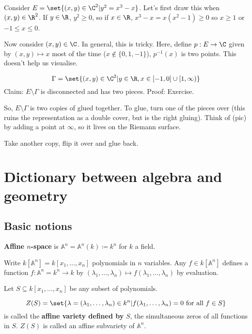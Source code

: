 \documentclass{article}
\newcommand{\A}{\mathbb{A}}
\begin{document}
\maketitle

Consider $E = \set{(x, y) \in \C^2 | y^2 = x^3 - x}$. Let's first draw this when $(x, y) \in \R^2$.
If $y \in \R$, $y^2 \geq 0$, so if $x \in \R$, $x^3 - x = x(x^2 - 1) \geq 0$ so $x \geq 1$ or $-1 \leq x \leq 0$.


Now consider $(x, y) \in \C$. In general, this is tricky.
Here, define $p: E \to \C$ given by $(x, y) \mapsto x$ most of the time ($x \notin \{0, 1, -1\}$), $p^{-1}(x)$ is two points.
This doesn't help us visualise.

\begin{equation*}
    \Gamma = \set{(x, y) \in \C^2 | y \in \R, x \in [-1, 0] \cup [1, \infty)}
\end{equation*}
Claim: $E \setminus \Gamma$ is disconnected and has two pieces.
Proof: Exercise.

So, $E \setminus \Gamma$ is two copies of
glued together. To glue, turn one of the pieces over (this ruins the representation as a double cover, but is the right gluing).
Think of (pic) by adding a point at $\infty$, so it lives on the Riemann surface.

Take another copy, flip it over and glue back.

\section{Dictionary between algebra and geometry}
\subsection{Basic notions}
\begin{defi}
    \textbf{Affine $n$-space} is $\A^n = \A^n(k) \coloneqq k^n$ for $k$ a field.
\end{defi}
Write $k[\A^n] = k[x_1, \dotsc, x_n]$ polynomials in $n$ variables.
Any $f \in k[\A^n]$ defines a function $f: \A^n =k^n \to k$ by $(\lambda_1, \dotsc, \lambda_n) \mapsto f(\lambda_1, \dotsc, \lambda_n)$ by evaluation.

Let $S \subseteq k[x_1, \dotsc, x_n]$ be any subset of polynomials.
\begin{defi}
    \begin{equation*}
        Z(S) = \set{\lambda = (\lambda_1, \dotsc, \lambda_n) \in k^n | f(\lambda_1, \dotsc, \lambda_n) = 0 \text{ for all } f \in S}
    \end{equation*}
    is called the \textbf{affine variety defined by} $S$, the simultaneous zeros of all functions in $S$.
    $Z(S)$ is called an affine subvariety of $\A^n$.
\end{defi}
\end{document}
